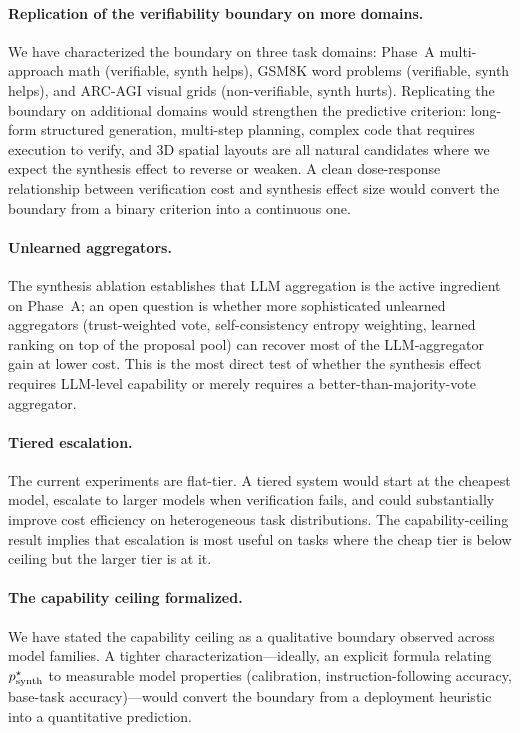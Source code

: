 \documentclass[11pt]{amsart}
\newcommand\1{{\mathds{1}}}
\theoremstyle{definition}
\theoremstyle{remark}
\numberwithin{equation}{section}
\begin{document}
\paragraph{Replication of the verifiability boundary on more domains.}
We have characterized the boundary on three task domains: Phase~A multi-approach math (verifiable, synth helps), GSM8K word problems (verifiable, synth helps), and ARC-AGI visual grids (non-verifiable, synth hurts).
Replicating the boundary on additional domains would strengthen the predictive criterion: long-form structured generation, multi-step planning, complex code that requires execution to verify, and 3D spatial layouts are all natural candidates where we expect the synthesis effect to reverse or weaken.
A clean dose-response relationship between verification cost and synthesis effect size would convert the boundary from a binary criterion into a continuous one.

\paragraph{Unlearned aggregators.}
The synthesis ablation establishes that LLM aggregation is the active ingredient on Phase~A; an open question is whether more sophisticated unlearned aggregators (trust-weighted vote, self-consistency entropy weighting, learned ranking on top of the proposal pool) can recover most of the LLM-aggregator gain at lower cost.
This is the most direct test of whether the synthesis effect requires LLM-level capability or merely requires a better-than-majority-vote aggregator.

\paragraph{Tiered escalation.}
The current experiments are flat-tier.
A tiered system would start at the cheapest model, escalate to larger models when verification fails, and could substantially improve cost efficiency on heterogeneous task distributions.
The capability-ceiling result implies that escalation is most useful on tasks where the cheap tier is below ceiling but the larger tier is at it.

\paragraph{The capability ceiling formalized.}
We have stated the capability ceiling as a qualitative boundary observed across model families.
A tighter characterization---ideally, an explicit formula relating $p_{\rm synth}^\star$ to measurable model properties (calibration, instruction-following accuracy, base-task accuracy)---would convert the boundary from a deployment heuristic into a quantitative prediction.
\end{document}
